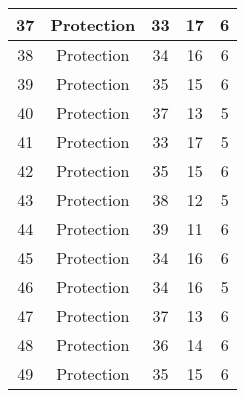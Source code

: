 \documentclass[results.tex]{subfiles}
\begin{document}
\begin{center}
\begin{tabular}{| c || c | c | c | c |}
            \hline
            37                      & Protection                   & 33                     & 17                      & 6                    \\
            \hline
            38                      & Protection                   & 34                     & 16                      & 6                    \\
            \hline
            39                      & Protection                   & 35                     & 15                      & 6                    \\
            \hline
            40                      & Protection                   & 37                     & 13                      & 5                    \\
            \hline
            41                      & Protection                   & 33                     & 17                      & 5                    \\
            \hline
            42                      & Protection                   & 35                     & 15                      & 6                    \\
            \hline
            43                      & Protection                   & 38                     & 12                      & 5                    \\
            \hline
            44                      & Protection                   & 39                     & 11                      & 6                    \\
            \hline
            45                      & Protection                   & 34                     & 16                      & 6                    \\
            \hline
            46                      & Protection                   & 34                     & 16                      & 5                    \\
            \hline
            47                      & Protection                   & 37                     & 13                      & 6                    \\
            \hline
            48                      & Protection                   & 36                     & 14                      & 6                    \\
            \hline
            49                      & Protection                   & 35                     & 15                      & 6                    \\
            \hline
        \end{tabular}
    \end{center}
\end{document}
